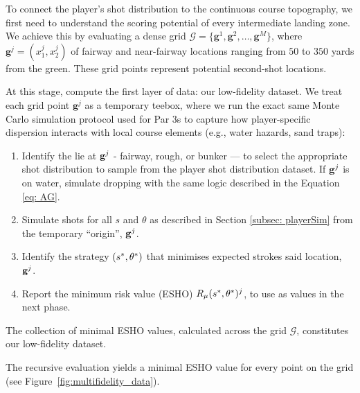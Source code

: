 \documentclass[11pt, letterpaper]{article}
\begin{document}
To connect the player's shot distribution to the continuous course topography, we first need to understand the scoring potential of every intermediate landing zone. We achieve this by evaluating a dense grid $\mathcal{G} = \{\mathbf{g}^1, \mathbf{g}^2, \ldots, \mathbf{g}^M\}$, where $\mathbf{g}^j = (x_1^j, x_2^j)$ of fairway and near-fairway locations ranging from $50$ to $350$ yards from the green. These grid points represent potential second-shot locations.

At this stage, compute the first layer of data: our low-fidelity dataset. We treat each grid point $\mathbf{g}^j$ as a temporary teebox, where we run the exact same Monte Carlo simulation protocol used for Par 3s to capture how player-specific dispersion interacts with local course elements (e.g., water hazards, sand traps):

\begin{enumerate}
    \item Identify the lie at $\mathbf{g}^j$ - fairway, rough, or bunker --- to select the appropriate shot distribution to sample from the player shot distribution dataset. If $\mathbf{g}^j$ is on water, simulate dropping with the same logic described in the Equation \eqref{eq: AG}.
    \item Simulate shots for all $s$ and $\theta$ as described in Section \ref{subsec: playerSim} from the temporary ``origin'', $\mathbf{g}^j$.
    \item Identify the strategy $(s^*, \theta^*)$ that minimises expected strokes said location, $\mathbf{g}^j$.
    \item Report the minimum risk value (ESHO) $R_{\mu}(s^*, \theta^*)^j$, to use as values in the next phase.
\end{enumerate}

The collection of minimal ESHO values, calculated across the grid $\mathcal{G}$, constitutes our low-fidelity dataset.

The recursive evaluation yields a minimal ESHO value for every point on the grid (see Figure~\ref{fig:multifidelity_data}). 

\end{document}
